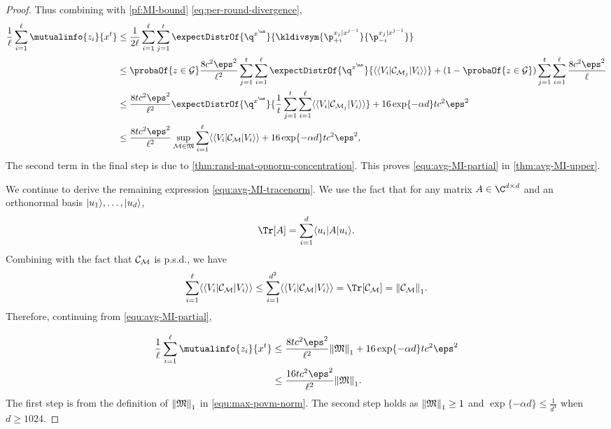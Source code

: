 \begin{proof}
Thus combining with \eqref{pf:MI-bound} \eqref{eq:per-round-divergence},
\begin{align*}
    \frac{1}{\ell}\sum_{i=1}^{\ell}\mutualinfo{\ptb_i}{\out^t} &\le \frac{1}{2\ell}\sum_{i=1}^{\ell}\sum_{j=1}^{t} \expectDistrOf{\q^{\out^\ns}}{\kldivsym{\p^{\out_{j}|\out^{j-1}}_{+i}}{\p^{\out_{j}|\out^{j-1}}_{-i}}} \\
    &\leq \probaOf{z \in \mathcal{G}} \frac{8 c^2 \eps^2}{\ell^2} \sum_{j=1}^{t} \sum_{i=1}^{\ell} \expectDistrOf{\q^{\out^\ns}}{ \vadj{V_i} \Choi_{\POVM_j} \vvec{V_i}}
    + (1 - \probaOf{z \in \mathcal{G}}) \sum_{j=1}^{t} \sum_{i=1}^{\ell}  \frac{8c^2\eps^2}{\ell} \\
    &\le  \frac{8 tc^2 \eps^2}{\ell^2}  \expectDistrOf{\q^{\out^\ns}}{\frac{1}{t}\sum_{j=1}^{t}\sum_{i=1}^\ell \vadj{V_i} {\Choi}_{\POVM_j} \vvec{V_i}} +16\exp\{-\alpha\dims\}tc^2\eps^2\\
    &\le \frac{8 tc^2 \eps^2}{\ell^2}  \sup_{\POVM\in\povmset}\sum_{i=1}^\ell \vadj{V_i} {\Choi}_{\POVM} \vvec{V_i} +16\exp\{-\alpha\dims\}tc^2\eps^2,
\end{align*}
The second term in the final step is due to \cref{thm:rand-mat-opnorm-concentration}. This proves \eqref{equ:avg-MI-partial} in \cref{thm:avg-MI-upper}.

We continue to derive the remaining expression \eqref{equ:avg-MI-tracenorm}. We use the fact that for any matrix $A\in\C^{\dims\times\dims}$ and an orthonormal basis $|{u_1}\rangle, \ldots, |{u_d}\rangle$,
\[
\Tr[A]=\sum_{i=1}^{\dims}\matdotprod{u_i}{A}{u_i}.
\]
Combining with the fact that ${{\mathcal{C}}}_{\mathcal{M}}$ is p.s.d., we have
\[
\sum_{i=1}^{\ell} \vadj{V_i} {\Choi}_{\POVM} \vvec{V_i}\le \sum_{i=1}^{\dims^2}\vadj{V_i}\Choi_{\POVM} \vvec{V_i}=\Tr[\Choi_{\POVM}]=\tracenorm{\Choi_{\POVM}}.
\]
Therefore, continuing from \eqref{equ:avg-MI-partial},

\begin{align*}
     \frac{1}{\ell}\sum_{i=1}^{\ell}\mutualinfo{\ptb_i}{\out^t} 
    &\le \frac{8 t c^2 \eps^2}{\ell^2} \tracenorm{\povmset} + 16\exp\{-\alpha\dims\}tc^2\eps^2\\
    & \le \frac{16 t c^2 \eps^2}{\ell^2} \tracenorm{\povmset}.
\end{align*}
The first step is from the definition of ${\left\|{\mathfrak{M}}\right\|}_{1}$ in \eqref{equ:max-povm-norm}. The second step holds as ${\left\|{\mathfrak{M}}\right\|}_{1}\ge 1$ and $\exp\{-\alpha d\} \leq \frac{1}{d^4}$ when $d \geq 1024$. 
\end{proof}

